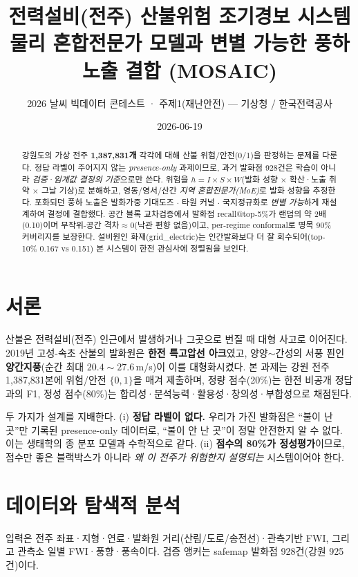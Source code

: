 \documentclass[10pt,twocolumn,a4paper]{article}
\title{\vspace{-1.0cm}\textbf{전력설비(전주) 산불위험 조기경보 시스템}\\[2pt]
\large 물리 혼합전문가 모델과 변별 가능한 풍하 노출 결합 (MOSAIC)}
\author{\normalsize 2026 날씨 빅데이터 콘테스트 · 주제1(재난안전) — 기상청 / 한국전력공사}
\date{\normalsize 2026-06-19}
\begin{document}
\maketitle

\begin{abstract}
\noindent
강원도의 가상 전주 \textbf{1{,}387{,}831개} 각각에 대해 산불 위험/안전(0/1)을 판정하는
문제를 다룬다. 정답 라벨이 주어지지 않는 \emph{presence-only} 과제이므로, 과거 발화점
928건은 학습이 아니라 \emph{검증·임계값 결정의 기준}으로만 쓴다. 위험을
$h = I \times S \times W$(발화 성향 $\times$ 확산·노출 취약 $\times$ 그날 기상)로 분해하고,
영동/영서/산간 \emph{지역 혼합전문가(MoE)}로 발화 성향을 추정한다. 포화되던 풍하 노출은
발화가중 기대도즈 $\cdot$ 타원 커널 $\cdot$ 국지정규화로 \emph{변별 가능}하게 재설계하여 결정에
결합했다. 공간 블록 교차검증에서 발화점 recall@top-5\%가 랜덤의 약 2배(0.10)이며
무작위-공간 격차$\approx$0(낙관 편향 없음)이고, per-regime conformal로 명목 90\% 커버리지를
보장한다. 설비원인 화재(grid\_electric)는 인간발화보다 더 잘 회수되어(top-10\% 0.167 vs
0.151) 본 시스템이 한전 관심사에 정렬됨을 보인다.
\end{abstract}

\section{서론}
산불은 전력설비(전주) 인근에서 발생하거나 그곳으로 번질 때 대형 사고로 이어진다.
2019년 고성-속초 산불의 발화원은 \textbf{한전 특고압선 아크}였고, 양양$\sim$간성의 서풍 푄인
\textbf{양간지풍}(순간 최대 $20.4\sim27.6$\,m/s)이 이를 대형화시켰다. 본 과제는 강원 전주
1,387,831본에 위험/안전 $\{0,1\}$을 매겨 제출하며, 정량 점수(20\%)는 한전 비공개 정답과의
F1, 정성 점수(80\%)는 합리성·분석능력·활용성·창의성·부합성으로 채점된다.

두 가지가 설계를 지배한다. (i) \textbf{정답 라벨이 없다.} 우리가 가진 발화점은 ``불이 난 곳''만
기록된 presence-only 데이터로, ``불이 안 난 곳''이 정말 안전한지 알 수 없다. 이는 생태학의
종 분포 모델과 수학적으로 같다. (ii) \textbf{점수의 80\%가 정성평가}이므로, 점수만 좋은
블랙박스가 아니라 \emph{왜 이 전주가 위험한지 설명되는} 시스템이어야 한다.

\section{데이터와 탐색적 분석}
입력은 전주 좌표·지형·연료·발화원 거리(산림/도로/송전선)·관측기반 FWI, 그리고
관측소 일별 FWI·풍향·풍속이다. 검증 앵커는 safemap 발화점 928건(강원 925건)이다.
\end{document}
